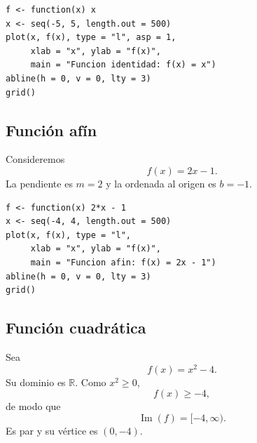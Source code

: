 \documentclass[12pt]{article}
\theoremstyle{remark}
\newcommand{\R}{\mathbb{R}}
\newcommand{\Ima}{\operatorname{Im}}
\begin{document}
\begin{verbatim}
f <- function(x) x
x <- seq(-5, 5, length.out = 500)
plot(x, f(x), type = "l", asp = 1,
     xlab = "x", ylab = "f(x)",
     main = "Funcion identidad: f(x) = x")
abline(h = 0, v = 0, lty = 3)
grid()
\end{verbatim}

\subsection{Función afín}

Consideremos
\[
f(x)=2x-1.
\]
La pendiente es $m=2$ y la ordenada al origen es $b=-1$.

\begin{center}
\end{center}

\begin{verbatim}
f <- function(x) 2*x - 1
x <- seq(-4, 4, length.out = 500)
plot(x, f(x), type = "l",
     xlab = "x", ylab = "f(x)",
     main = "Funcion afin: f(x) = 2x - 1")
abline(h = 0, v = 0, lty = 3)
grid()
\end{verbatim}

\subsection{Función cuadrática}

Sea
\[
f(x)=x^2-4.
\]
Su dominio es $\R$. Como $x^2\geq0$,
\[
f(x)\geq-4,
\]
de modo que
\[
\Ima(f)=[-4,\infty).
\]
Es par y su vértice es $(0,-4)$.

\begin{center}
\end{center}
\end{document}
